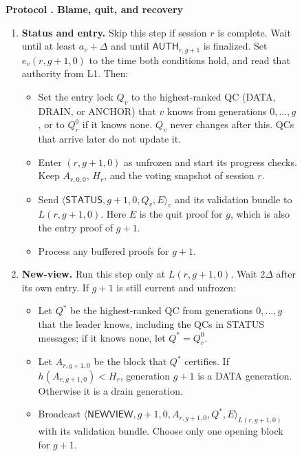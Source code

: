 \documentclass[11pt,a4paper]{article}
\newcommand{\RR}[1]{{\color{rrRed}#1}}
\newcommand{\tagg}[1]{\ensuremath{\mathsf{#1}}}
\newcounter{protocol}
\newenvironment{protocol}[2]{\begin{figure}[htbp]\refstepcounter{protocol}\label{#1}
\begin{mdframed}[linewidth=.6pt,skipabove=0pt,skipbelow=0pt,
innertopmargin=7pt,innerbottommargin=7pt]\small
\textbf{Protocol \theprotocol. #2}\par\smallskip}{\end{mdframed}\end{figure}}
\begin{document}
\begin{protocol}{alg:recovery}{Blame, quit, and recovery}
\begin{enumerate}[label=\textbf{\arabic*)},itemsep=3pt]
\item \textbf{Status and entry.} \RR{Skip this step if session $r$ is
complete.} \RR{Wait until at least $a_v+\Delta$ and until
$\tagg{AUTH}_{r,g+1}$ is finalized. Set $e_v(r,g+1,0)$ to the time both
conditions hold, and read that authority from L1.} Then:
 \begin{itemize}
 \item Set the entry lock $Q_v$ to the highest-ranked QC
       (DATA\RR{, DRAIN,} or ANCHOR) that $v$ knows from generations
       $0,\ldots,g$\RR{, or to $Q_r^0$ if it knows none}.
       $Q_v$ never changes after this. QCs that arrive later do not
       update it.
 \item Enter $(r,g+1,0)$ as unfrozen and start its progress checks.
       \RR{Keep $A_{r,0,0}$, $H_r$, and the voting snapshot of session $r$.}
 \item Send $\langle\tagg{STATUS},g+1,0,Q_v,E\rangle_v$ and its
       validation bundle to $L(r,g+1,0)$. Here $E$ is the quit proof for
       $g$, which is also the entry proof of $g+1$.
 \item Process any buffered proofs for $g+1$.
 \end{itemize}

\item \textbf{New-view.} Run this step only at $L(r,g+1,0)$. Wait $2\Delta$
after its own entry. If $g+1$ is still current and unfrozen:
 \begin{itemize}
 \item Let $Q^*$ be the highest-ranked QC from generations $0,\ldots,g$
       that the leader knows, including the QCs in STATUS
       messages\RR{; if it knows none, let $Q^*=Q_r^0$}.
 \item Let $A_{r,g+1,0}$ be the block that $Q^*$ certifies. \RR{If
       $h(A_{r,g+1,0})<H_r$, generation $g+1$ is a DATA generation.
       Otherwise it is a drain generation.}
 \item Broadcast
       $\langle\tagg{NEWVIEW},g+1,0,A_{r,g+1,0},Q^*,E\rangle_{L(r,g+1,0)}$
       with its validation bundle. Choose only one opening block for
       $g+1$.
 \end{itemize}


\end{enumerate}
\end{protocol}
\end{document}
